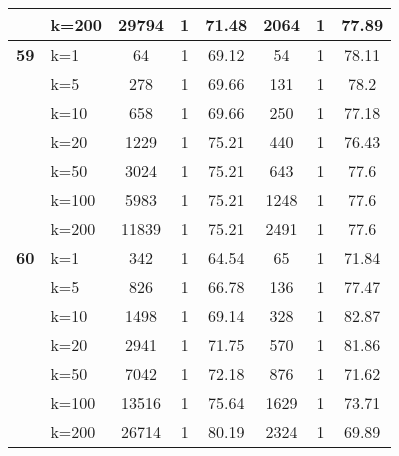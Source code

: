 \begin{table}[htbp]
\begin{tabular}{|l|l|c|c|c|c|c|c|}
     & k=200 & 29794 & 1 & 71.48 & 2064 & 1 & 77.89 \\ \hline
    \multicolumn{1}{|r|}{\textbf{59}} & k=1 & 64 & 1 & 69.12 & 54 & 1 & 78.11 \\ 
     & k=5 & 278 & 1 & 69.66 & 131 & 1 & 78.2 \\ 
     & k=10 & 658 & 1 & 69.66 & 250 & 1 & 77.18 \\ 
     & k=20 & 1229 & 1 & 75.21 & 440 & 1 & 76.43 \\ 
     & k=50 & 3024 & 1 & 75.21 & 643 & 1 & 77.6 \\ 
     & k=100 & 5983 & 1 & 75.21 & 1248 & 1 & 77.6 \\ 
     & k=200 & 11839 & 1 & 75.21 & 2491 & 1 & 77.6 \\ \hline
    \multicolumn{1}{|r|}{\textbf{60}} & k=1 & 342 & 1 & 64.54 & 65 & 1 & 71.84 \\ 
     & k=5 & 826 & 1 & 66.78 & 136 & 1 & 77.47 \\ 
     & k=10 & 1498 & 1 & 69.14 & 328 & 1 & 82.87 \\ 
     & k=20 & 2941 & 1 & 71.75 & 570 & 1 & 81.86 \\ 
     & k=50 & 7042 & 1 & 72.18 & 876 & 1 & 71.62 \\ 
     & k=100 & 13516 & 1 & 75.64 & 1629 & 1 & 73.71 \\ 
     & k=200 & 26714 & 1 & 80.19 & 2324 & 1 & 69.89 \\ \hline
    \end{tabular}
\end{table}
